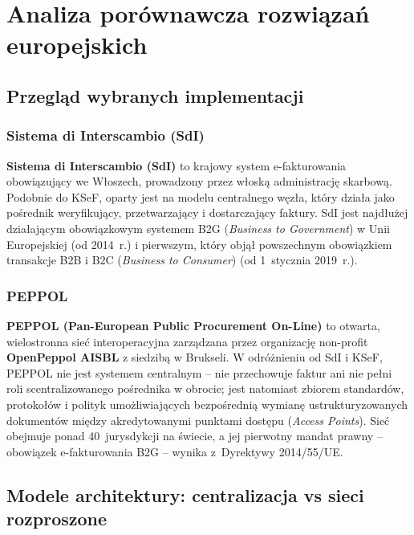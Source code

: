 \section{Analiza porównawcza rozwiązań europejskich}
\label{sec:porownanie}

\subsection{Przegląd wybranych implementacji}
\label{sec:porownanie-europa}

\subsubsection{Sistema di Interscambio (SdI)}
\label{sec:wstep-sdi}

\textbf{Sistema di Interscambio (SdI)} to krajowy system e-fakturowania obowiązujący we Włoszech, prowadzony przez włoską administrację skarbową. Podobnie do KSeF, oparty jest na modelu centralnego węzła, który działa jako pośrednik weryfikujący, przetwarzający i dostarczający faktury. SdI jest najdłużej działającym obowiązkowym systemem B2G (\textit{Business to Government}) w Unii Europejskiej (od 2014~r.) i pierwszym, który objął powszechnym obowiązkiem transakcje B2B i B2C (\textit{Business to Consumer}) (od 1~stycznia 2019~r.). \cite{edicom-einvoicing-italy,sdi-fatturapa-cose,ec-einvoicing-italy-2025}

\subsubsection{PEPPOL}
\label{sec:wstep-peppol}

\textbf{PEPPOL (Pan-European Public Procurement On-Line)} to otwarta, wielostronna sieć interoperacyjna zarządzana przez organizację non-profit \textbf{OpenPeppol AISBL} z siedzibą w Brukseli. W odróżnieniu od SdI i KSeF, PEPPOL nie jest systemem centralnym -- nie przechowuje faktur ani nie pełni roli scentralizowanego pośrednika w obrocie; jest natomiast zbiorem standardów, protokołów i polityk umożliwiających bezpośrednią wymianę ustrukturyzowanych dokumentów między akredytowanymi punktami dostępu (\textit{Access Points}). Sieć obejmuje ponad 40~jurysdykcji na świecie, a jej pierwotny mandat prawny -- obowiązek e-fakturowania B2G -- wynika z~Dyrektywy 2014/55/UE. \cite{peppol-interop-framework,dir-2014-55-ue}

\subsection{Modele architektury: centralizacja vs sieci rozproszone}
\label{sec:porownanie-modele-architektury}

